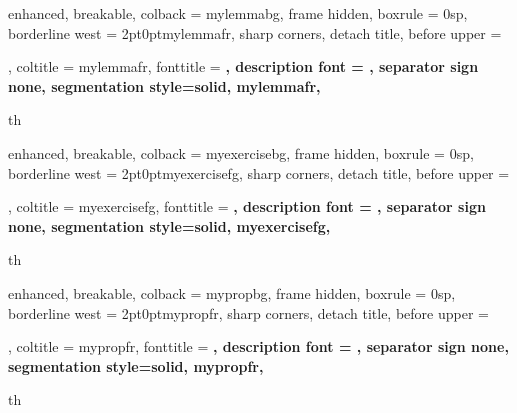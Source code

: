 
{%
	enhanced,
	breakable,
	colback = mylemmabg,
	frame hidden,
	boxrule = 0sp,
	borderline west = {2pt}{0pt}{mylemmafr},
	sharp corners,
	detach title,
	before upper = \tcbtitle\par\smallskip,
	coltitle = mylemmafr,
	fonttitle = \bfseries\sffamily,
	description font = \mdseries,
	separator sign none,
	segmentation style={solid, mylemmafr},
}
{th}



{%
	enhanced,
	breakable,
	colback = myexercisebg,
	frame hidden,
	boxrule = 0sp,
	borderline west = {2pt}{0pt}{myexercisefg},
	sharp corners,
	detach title,
	before upper = \tcbtitle\par\smallskip,
	coltitle = myexercisefg,
	fonttitle = \bfseries\sffamily,
	description font = \mdseries,
	separator sign none,
	segmentation style={solid, myexercisefg},
}
{th}




{%
	enhanced,
	breakable,
	colback = mypropbg,
	frame hidden,
	boxrule = 0sp,
	borderline west = {2pt}{0pt}{mypropfr},
	sharp corners,
	detach title,
	before upper = \tcbtitle\par\smallskip,
	coltitle = mypropfr,
	fonttitle = \bfseries\sffamily,
	description font = \mdseries,
	separator sign none,
	segmentation style={solid, mypropfr},
}
{th}

